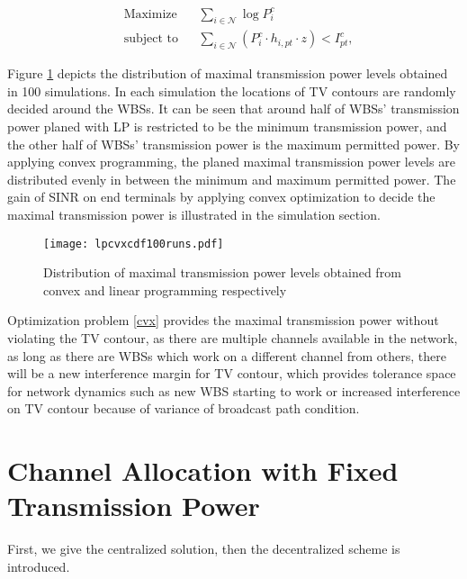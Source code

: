 	\begin{equation}
		\label{cvx}
		\begin{aligned}
		& {\text{Maximize}}
		& & \sum_{i\in \mathcal{N}} \log P^c_i \\
		& \text{subject to}
		& & \sum_{i\in \mathcal{N}} (P^c_i \cdot h_{i,pt}\cdot z) < I^c_{pt}, 
		\end{aligned}
	\end{equation}


Figure \ref{lpcvx} depicts the distribution of maximal transmission power levels obtained in 100 simulations. In each simulation the locations of TV contours are randomly decided around the WBSs. It can be seen that around half of WBSs' transmission power planed with LP is restricted to be the minimum transmission power, and the other half of WBSs' transmission power is the maximum permitted power. By applying convex programming, the planed maximal transmission power levels are distributed evenly in between the minimum and maximum permitted power. The gain of SINR on end terminals by applying convex optimization to decide the maximal transmission power is illustrated in the simulation section.

\begin{figure}[h!]
  \centering
  \texttt{[image: lpcvxcdf100runs.pdf]}
  \caption{Distribution of maximal transmission power levels obtained from convex and linear programming respectively}
\label{lpcvx}
\end{figure}


Optimization problem \ref{cvx} provides the maximal transmission power without violating the TV contour, as there are multiple channels available in the network, as long as there are WBSs which work on a different channel from others, there will be a new interference margin for TV contour, which provides tolerance space for network dynamics such as new WBS starting to work or increased interference on TV contour because of variance of broadcast path condition. 


\section{Channel Allocation with Fixed Transmission Power}
\label{CA_fixedPower_2subproblem}
First, we give the centralized solution, then the decentralized scheme is introduced.
